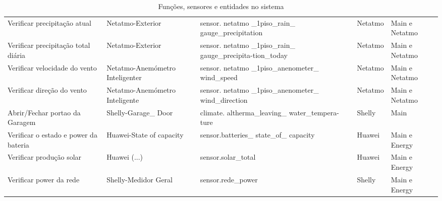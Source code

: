 \begin{table}[h!]
{\begin{tabularx}{\textwidth}{|X|p{2.5cm}|>{\raggedright\arraybackslash}X|p{2.1cm}|p{2.1cm}|}
Verificar precipitação atual & Netatmo-Exterior & sensor. netatmo \_1piso\_rain\_ gauge\_precipitation & Netatmo & Main e Netatmo \\

Verificar precipitação total diária & Netatmo-Exterior & sensor. netatmo \_1piso\_rain\_ gauge\_precipita-tion\_today & Netatmo & Main e Netatmo \\

Verificar velocidade do vento & Netatmo-Anemómetro Inteligenter & sensor. netatmo \_1piso\_anenometer\_ wind\_speed & Netatmo & Main e Netatmo \\

Verificar direção do vento & Netatmo-Anemómetro Inteligente & sensor. netatmo \_1piso\_anenometer\_ wind\_direction & Netatmo & Main e Netatmo \\

Abrir/Fechar portao da Garagem & Shelly-Garage\_ Door & climate. altherma\_leaving\_ water\_tempera-ture & Shelly & Main \\

Verificar o estado e power da bateria & Huawei-State of capacity & sensor.batteries\_ state\_of\_ capacity & Huawei & Main e Energy \\

Verificar produção solar & Huawei (...) & sensor.solar\_total & Huawei & Main e Energy \\

Verificar power da rede & Shelly-Medidor Geral & sensor.rede\_power & Shelly & Main e Energy \\


\hline
\end{tabularx}
}
\caption{Funções, sensores e entidades no sistema}
\end{table}


